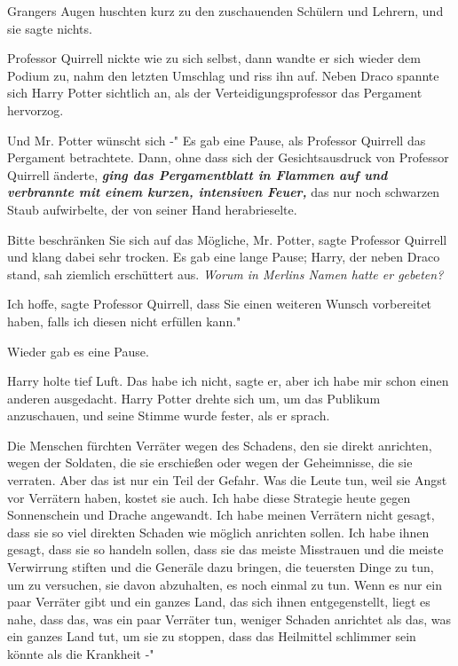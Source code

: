 Grangers Augen huschten kurz zu den zuschauenden Schülern und Lehrern, und sie
sagte nichts.

Professor Quirrell nickte wie zu sich selbst, dann wandte er sich wieder dem
Podium zu, nahm den letzten Umschlag und riss ihn auf. Neben Draco spannte sich
Harry Potter sichtlich an, als der Verteidigungsprofessor das Pergament
hervorzog.

\glqq Und Mr. Potter wünscht sich -" Es gab eine Pause, als Professor Quirrell
das Pergament betrachtete. Dann, ohne dass sich der Gesichtsausdruck von
Professor Quirrell änderte,\textbf{\emph{ ging das Pergamentblatt in Flammen auf
und verbrannte mit einem kurzen, intensiven Feuer,}} das nur noch schwarzen
Staub aufwirbelte, der von seiner Hand herabrieselte.

\glqq Bitte beschränken Sie sich auf das Mögliche, Mr. Potter\grqq{}, sagte
Professor Quirrell und klang dabei sehr trocken. Es gab eine lange Pause; Harry,
der neben Draco stand, sah ziemlich erschüttert aus. \emph{Worum in Merlins
Namen hatte er gebeten?}

\glqq Ich hoffe\grqq{}, sagte Professor Quirrell, \glqq dass Sie einen weiteren
Wunsch vorbereitet haben, falls ich diesen nicht erfüllen kann."

Wieder gab es eine Pause.

Harry holte tief Luft. \glqq Das habe ich nicht\grqq{}, sagte er, \glqq aber ich
habe mir schon einen anderen ausgedacht.\grqq{} Harry Potter drehte sich um, um
das Publikum anzuschauen, und seine Stimme wurde fester, als er sprach.

\glqq Die Menschen fürchten Verräter wegen des Schadens, den sie direkt
anrichten, wegen der Soldaten, die sie erschießen oder wegen der Geheimnisse,
die sie verraten. Aber das ist nur ein Teil der Gefahr. Was die Leute tun, weil
sie Angst vor Verrätern haben, kostet sie auch. Ich habe diese Strategie heute
gegen Sonnenschein und Drache angewandt. Ich habe meinen Verrätern nicht gesagt,
dass sie so viel direkten Schaden wie möglich anrichten sollen. Ich habe ihnen
gesagt, dass sie so handeln sollen, dass sie das meiste Misstrauen und die
meiste Verwirrung stiften und die Generäle dazu bringen, die teuersten Dinge zu
tun, um zu versuchen, sie davon abzuhalten, es noch einmal zu tun. Wenn es nur
ein paar Verräter gibt und ein ganzes Land, das sich ihnen entgegenstellt, liegt
es nahe, dass das, was ein paar Verräter tun, weniger Schaden anrichtet als das,
was ein ganzes Land tut, um sie zu stoppen, dass das Heilmittel schlimmer sein
könnte als die Krankheit -"


